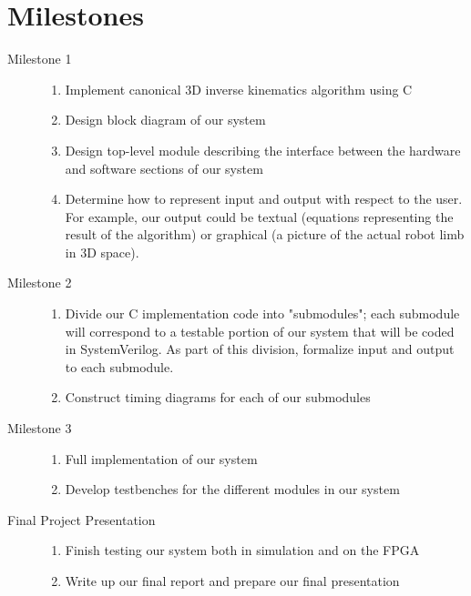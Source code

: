 \section{Milestones}

\begin{description}
\item[Milestone 1] \hfill
\begin{enumerate}
\item Implement canonical 3D inverse kinematics algorithm using C
\item Design block diagram of our system
\item Design top-level module describing the interface between the hardware and software sections of our system
\item Determine how to represent input and output with respect to the user. For example,
	our output could be textual (equations representing the result of the algorithm) or
	graphical (a picture of the actual robot limb in 3D space).
\end{enumerate}

\newpage

\item[Milestone 2] \hfill 
\begin{enumerate}
\item Divide our C implementation code into "submodules"; each submodule will correspond
to a testable portion of our system that will be coded in SystemVerilog. As part of this
division, formalize input and output to each submodule.
\item Construct timing diagrams for each of our submodules
\end{enumerate}

\item[Milestone 3] \hfill 
\begin{enumerate}
\item Full implementation of our system
\item Develop testbenches for the different modules in our system
\end{enumerate}

\item[Final Project Presentation] \hfill
\begin{enumerate}
\item Finish testing our system both in simulation and on the FPGA
\item Write up our final report and prepare our final presentation
\end{enumerate}

\end{description}

%
%
%
%
%

